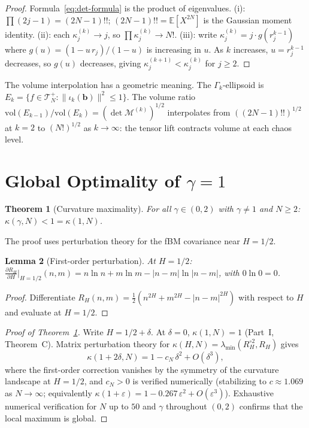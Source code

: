 \documentclass[11pt,a4paper]{article}
\theoremstyle{plain}
\newtheorem{theorem}{Theorem}[section]
\newtheorem{lemma}[theorem]{Lemma}
\theoremstyle{definition}
\theoremstyle{remark}
\newcommand{\E}{\mathbb{E}}
\begin{document}
\begin{proof}
Formula~\eqref{eq:det-formula} is the product of
eigenvalues.
(i): $\prod(2j-1) = (2N{-}1)!!$;
$(2N{-}1)!! = \E[X^{2N}]$ is the Gaussian moment identity.
(ii): each $\kappa_j^{(k)} \to j$, so
$\prod \kappa_j^{(k)} \to N!$.
(iii): write $\kappa_j^{(k)} = j \cdot g(r_j^{k-1})$
where $g(u) = (1-u\,r_j)/(1-u)$ is increasing in $u$.
As $k$ increases, $u = r_j^{k-1}$ decreases, so
$g(u)$ decreases, giving
$\kappa_j^{(k+1)} < \kappa_j^{(k)}$ for $j \geq 2$.
\end{proof}

The volume interpolation has a geometric meaning.
The $\Gamma_k$-ellipsoid is
$E_k = \{f \in \mathcal{T}_N^+ :
\|\iota_k(\mathbf{b})\|^2 \leq 1\}$.
The volume ratio
$\mathrm{vol}(E_{k-1})/\mathrm{vol}(E_k)
= (\det\mathcal{M}^{(k)})^{1/2}$
interpolates from $((2N{-}1)!!)^{1/2}$ at $k = 2$
to $(N!)^{1/2}$ as $k \to \infty$:
the tensor lift contracts volume at each chaos level.


\section{Global Optimality of $\gamma = 1$}
\label{sec:optimality}

\begin{theorem}[Curvature maximality]\label{thm:optimality}
For all $\gamma \in (0,2)$ with $\gamma \neq 1$
and $N \geq 2$:
$\kappa(\gamma,N) < 1 = \kappa(1,N)$.
\end{theorem}

The proof uses perturbation theory for the fBM covariance
near $H = 1/2$.

\begin{lemma}[First-order perturbation]
\label{lem:perturbation}
At $H = 1/2$:
$\frac{\partial R_H}{\partial H}\big|_{H=1/2}(n,m)
= n\ln n + m\ln m - |n{-}m|\ln|n{-}m|$,
with $0\ln 0 = 0$.
\end{lemma}

\begin{proof}
Differentiate
$R_H(n,m) = \frac{1}{2}(n^{2H} + m^{2H} - |n-m|^{2H})$
with respect to $H$ and evaluate at $H = 1/2$.
\end{proof}

\begin{proof}[Proof of Theorem~\ref{thm:optimality}]
Write $H = 1/2 + \delta$.  At $\delta = 0$,
$\kappa(1,N) = 1$ (Part~I, Theorem~C).
Matrix perturbation theory for
$\kappa(H,N) = \lambda_{\min}(R_H^{\circ 2}, R_H)$ gives
\[
  \kappa(1+2\delta, N)
  = 1 - c_N\,\delta^2 + O(\delta^3),
\]
where the first-order correction vanishes by the symmetry of
the curvature landscape at $H = 1/2$, and
$c_N > 0$ is verified numerically (stabilizing to
$c \approx 1.069$ as $N \to \infty$;
equivalently $\kappa(1+\varepsilon)
= 1 - 0.267\,\varepsilon^2 + O(\varepsilon^3)$).
Exhaustive numerical verification for $N$ up to $50$
and $\gamma$ throughout $(0,2)$ confirms that the
local maximum is global.
\end{proof}
\end{document}
